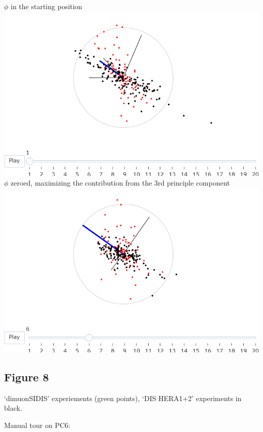 \documentclass{monashthesis}
\begin{document}
\(\phi\) in the starting position
\includegraphics{./output/fig7_phi_start.png}
\(\phi\) zeroed, maximizing the contribution from the 3rd principle component
\includegraphics{./output/fig7_phi0.png}

\hypertarget{figure-8}{%
\subsection{Figure 8}\label{figure-8}}

`dimuonSIDIS' experiements (green points), `DIS HERA1+2' experiments in black.

Manual tour on PC6:
\end{document}
